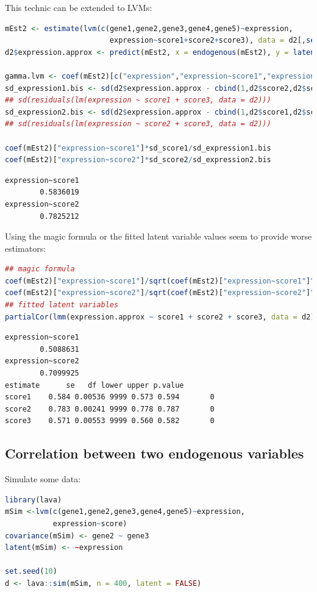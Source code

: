 \documentclass{article}
\begin{document}
This technic can be extended to LVMs:
\begin{lstlisting}[language=r,numbers=none]
mEst2 <- estimate(lvm(c(gene1,gene2,gene3,gene4,gene5)~expression,
                        expression~score1+score2+score3), data = d2[,setdiff(names(d2),"expression")])
d2$expression.approx <- predict(mEst2, x = endogenous(mEst2), y = latent(mEst2))

gamma.lvm <- coef(mEst2)[c("expression","expression~score1","expression~score2","expression~score3")]
sd_expression1.bis <- sd(d2$expression.approx - cbind(1,d2$score2,d2$score3) %*% (gamma.lvm[-2] + gamma.lvm[2]*coef(e.lm1vs23)))
## sd(residuals(lm(expression ~ score1 + score3, data = d2)))
sd_expression2.bis <- sd(d2$expression.approx - cbind(1,d2$score1,d2$score3) %*% (gamma.lvm[-3] + gamma.lvm[3]*coef(e.lm2vs13)))
## sd(residuals(lm(expression ~ score2 + score3, data = d2)))

coef(mEst2)["expression~score1"]*sd_score1/sd_expression1.bis
coef(mEst2)["expression~score2"]*sd_score2/sd_expression2.bis
\end{lstlisting}

\label{}
\begin{verbatim}
expression~score1 
        0.5836019
expression~score2 
        0.7825212
\end{verbatim}


\Warning Using the magic formula or the fitted latent variable values
seem to provide worse estimators:
\begin{lstlisting}[language=r,numbers=none]
## magic formula
coef(mEst2)["expression~score1"]/sqrt(coef(mEst2)["expression~score1"]^2+vcov(mEst2)["expression~score1","expression~score1"]*(NROW(d2)-3))
coef(mEst2)["expression~score2"]/sqrt(coef(mEst2)["expression~score2"]^2+vcov(mEst2)["expression~score2","expression~score2"]*(NROW(d2)-3))
## fitted latent variables
partialCor(lmm(expression.approx ~ score1 + score2 + score3, data = d2))
\end{lstlisting}

\label{}
\begin{verbatim}
expression~score1 
        0.5088631
expression~score2 
        0.7099925
estimate      se   df lower upper p.value
score1    0.584 0.00536 9999 0.573 0.594       0
score2    0.783 0.00241 9999 0.778 0.787       0
score3    0.571 0.00553 9999 0.560 0.582       0
\end{verbatim}
\subsection{Correlation between two endogenous variables}
\label{sec:org208fba1}
Simulate some data:
\begin{lstlisting}[language=r,numbers=none]
library(lava)
mSim <-lvm(c(gene1,gene2,gene3,gene4,gene5)~expression,
           expression~score)
covariance(mSim) <- gene2 ~ gene3
latent(mSim) <- ~expression

set.seed(10)
d <- lava::sim(mSim, n = 400, latent = FALSE)
\end{lstlisting}
\end{document}
